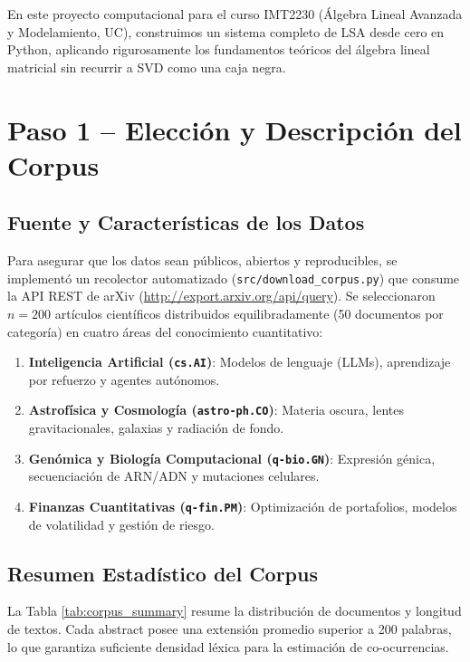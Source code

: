 \documentclass[11pt,a4paper]{article}
\begin{document}
En este proyecto computacional para el curso IMT2230 (Álgebra Lineal Avanzada y Modelamiento, UC), construimos un sistema completo de LSA desde cero en Python, aplicando rigurosamente los fundamentos teóricos del álgebra lineal matricial sin recurrir a SVD como una caja negra.

\section{Paso 1 -- Elección y Descripción del Corpus}
\subsection{Fuente y Características de los Datos}
Para asegurar que los datos sean públicos, abiertos y reproducibles, se implementó un recolector automatizado (\texttt{src/download\_corpus.py}) que consume la API REST de arXiv (\url{http://export.arxiv.org/api/query}). Se seleccionaron $n = 200$ artículos científicos distribuidos equilibradamente (50 documentos por categoría) en cuatro áreas del conocimiento cuantitativo:
\begin{enumerate}
    \item \textbf{Inteligencia Artificial (\texttt{cs.AI})}: Modelos de lenguaje (LLMs), aprendizaje por refuerzo y agentes autónomos.
    \item \textbf{Astrofísica y Cosmología (\texttt{astro-ph.CO})}: Materia oscura, lentes gravitacionales, galaxias y radiación de fondo.
    \item \textbf{Genómica y Biología Computacional (\texttt{q-bio.GN})}: Expresión génica, secuenciación de ARN/ADN y mutaciones celulares.
    \item \textbf{Finanzas Cuantitativas (\texttt{q-fin.PM})}: Optimización de portafolios, modelos de volatilidad y gestión de riesgo.
\end{enumerate}

\subsection{Resumen Estadístico del Corpus}
La Tabla \ref{tab:corpus_summary} resume la distribución de documentos y longitud de textos. Cada abstract posee una extensión promedio superior a 200 palabras, lo que garantiza suficiente densidad léxica para la estimación de co-ocurrencias.
\end{document}
